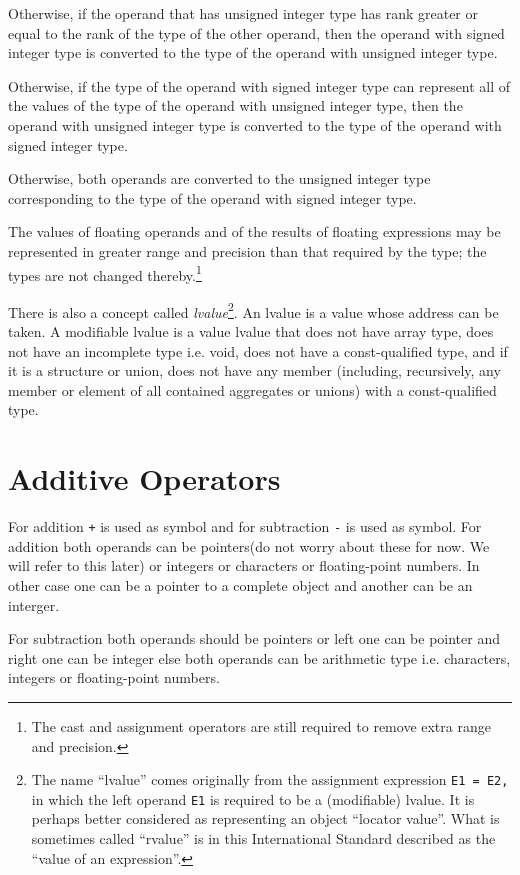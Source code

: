 \noindent Otherwise, if the operand that has unsigned integer type has rank greater or
equal to the rank of the type of the other operand, then the operand with
signed integer type is converted to the type of the operand with unsigned
integer type.


\noindent Otherwise, if the type of the operand with signed integer type can represent
all of the values of the type of the operand with unsigned integer type, then
the operand with unsigned integer type is converted to the type of the
operand with signed integer type.


\noindent Otherwise, both operands are converted to the unsigned integer type
corresponding to the type of the operand with signed integer type.


\setlength{\leftskip}{0cm}
The values of floating operands and of the results of floating expressions may
be represented in greater range and precision than that required by the type;
the types are not changed thereby.\footnote{The cast and assignment operators
  are still required to remove extra range and precision.}

There is also a concept called \textit{lvalue}\footnote{The name ``lvalue''
  comes originally from the assignment expression \texttt{E1 = E2,} in which
  the left operand \texttt{E1} is required to be a (modifiable) lvalue. It is
  perhaps better considered as representing an object ``locator value''. What
  is sometimes called ``rvalue'' is in this International Standard described 
  as the ``value of an expression''.}. An lvalue is a value whose
address can be taken. A modifiable lvalue is a value lvalue that does not have
array type, does not have an incomplete type i.e. void, does not have a
const-qualified type, and if it is a structure or union, does not have any
member (including, recursively, any member or element of all contained
aggregates or unions) with a const-qualified type.

\section{Additive Operators}
For addition \texttt{+} is used as symbol and for subtraction \texttt{-} is
used as symbol. For addition both operands can be pointers(do not worry about
these for now. We will refer to this later) or integers or characters or 
floating-point numbers. In other
case one can be a pointer to a complete object and another can be an interger.

For subtraction both operands should be pointers or left one can be pointer and
right one can be integer else both operands can be arithmetic type
i.e. characters, integers or floating-point numbers.

